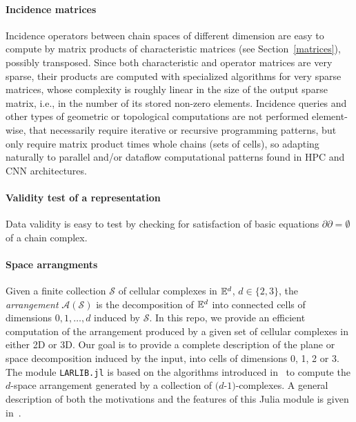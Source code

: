 \paragraph{Incidence matrices}
Incidence operators between chain spaces of different dimension are easy to compute by matrix products of characteristic matrices (see Section~\ref{matrices}), possibly transposed.
Since both characteristic and operator matrices are very sparse, their products are computed with  specialized algorithms for very sparse matrices, whose complexity is roughly linear in the size of the output sparse matrix, i.e., in the number of its stored non-zero elements.
Incidence queries and other types of geometric or topological computations are not performed element-wise, that necessarily require iterative or recursive programming patterns, but only require matrix product times whole chains (sets of cells), so adapting naturally to parallel and/or dataflow computational patterns found in HPC and CNN architectures.

\paragraph{Validity test of a representation}
Data validity is easy to test by checking for satisfaction of basic equations $\partial\partial=\emptyset$ of a chain complex.


\paragraph{Space arrangments}

Given a finite collection $\mathcal{S}$ of cellular complexes in $\mathbb{E}^d$,
$d \in \{2,3\}$, the \emph{arrangement} $\mathcal{A}(\mathcal{S})$ is the
decomposition of $\mathbb{E}^d$ into connected cells of dimensions
$0, 1, \ldots, d$ induced by $\mathcal{S}$.
In this repo, we provide an efficient computation of the arrangement produced by a given set of cellular complexes in either 2D or 3D. Our goal is to provide a
complete description of the plane or space decomposition induced by the
input, into cells of dimensions 0, 1, 2 or 3.
The module \texttt{LARLIB.jl} is based on the algorithms introduced in~\cite{DBLP:journals/corr/PaoluzziSD17} to compute the $d$-space arrangement generated by a collection of $(d$-$1)$-complexes. A general description of both the motivations and the features of this Julia module is given in~\cite{DBLP:journals/corr/abs-1710-07819}.

